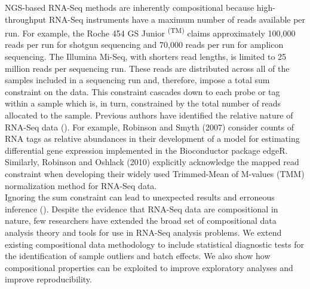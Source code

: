 \documentclass{article}\usepackage[]{graphicx}\usepackage[]{color}
\begin{document}
NGS-based RNA-Seq methods are inherently compositional because high-throughput RNA-Seq instruments have a maximum number of reads available per run.  For example, the Roche 454 GS Junior \textsuperscript{(TM)} claims approximately 100,000 reads per run for shotgun sequencing and 70,000 reads per run for amplicon sequencing.  The Illumina Mi-Seq, with shorters read lengths, is limited to 25 million reads per sequencing run.  These reads are distributed across all of the samples included in a sequencing run and, therefore, impose a total sum constraint on the data.  This constraint cascades down to each probe or tag within a sample which is, in turn, constrained by the total number of reads allocated to the sample.  Previous authors have identified the relative nature of RNA-Seq data (\cite{Robinson2007, Anders2010, Robinson2010, Law2014, Lovell2015}).  For example, Robinson and Smyth (2007) consider counts of RNA tags as relative abundances in their development of a model for estimating differential gene expression implemented in the Bioconductor package edgeR.  Similarly, Robinson and Oshlack (2010) explicitly acknowledge the mapped read constraint when developing their widely used Trimmed-Mean of M-values (TMM) normalization method for RNA-Seq data.  \\




Ignoring the sum constraint can lead to unexpected results and erroneous inference (\cite{Pearson1896, Aitchison1986, Lovell2011}).  Despite the evidence that RNA-Seq data are compositional in nature, few researchers have extended the broad set of compositional data analysis theory and tools for use in RNA-Seq analysis problems.  We extend existing compositional data methodology to include statistical diagnostic tests for the identification of sample outliers and batch effects. We also show how compositional properties can be exploited to improve exploratory analyses and improve reproducibility.\\

\end{document}
